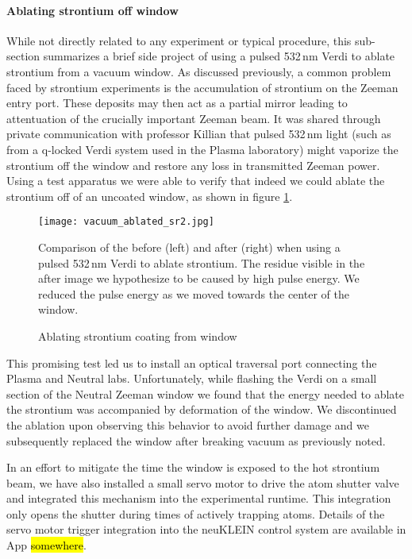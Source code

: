 \paragraph{Ablating strontium off window} \label{p:ablatingSr}
While not directly related to any experiment or typical procedure, this sub-section summarizes a brief side project of using a pulsed 532\,nm Verdi to ablate strontium from a vacuum window.
As discussed previously, a common problem faced by strontium experiments is the accumulation of strontium on the Zeeman entry port. 
These deposits may then act as a partial mirror leading to attentuation of the crucially important Zeeman beam. 
It was shared through private communication with professor Killian that pulsed 532\,nm light (such as from a q-locked Verdi system used in the Plasma laboratory) might vaporize the strontium off the window and restore any loss in transmitted Zeeman power. 
Using a test apparatus we were able to verify that indeed we could ablate the strontium off of an uncoated window, as shown in figure \ref{fig:ablating_strontium}.
	\begin{figure}
		\centerline{
		\texttt{[image: vacuum\_ablated\_sr2.jpg]}}
		\caption{Ablating strontium coating from window}{Comparison of the before (left) and after (right) when using a pulsed 532\,nm Verdi to ablate strontium. The residue visible in the after image we hypothesize to be caused by high pulse energy. We reduced the pulse energy as we moved towards the center of the window.}
		\label{fig:ablating_strontium}
	\end{figure}
This promising test led us to install an optical traversal port connecting the Plasma and Neutral labs. 
Unfortunately, while flashing the Verdi on a small section of the Neutral Zeeman window we found that the energy needed to ablate the strontium was accompanied by deformation of the window.
We discontinued the ablation upon observing this behavior to avoid further damage and we subsequently replaced the window after breaking vacuum as previously noted.

In an effort to mitigate the time the window is exposed to the hot strontium beam, we have also installed a small servo motor to drive the atom shutter valve and integrated this mechanism into the experimental runtime. 
This integration only opens the shutter during times of actively trapping atoms. 
Details of the servo motor trigger integration into the neuKLEIN control system are available in App \hl{somewhere}.

\pagebreak
